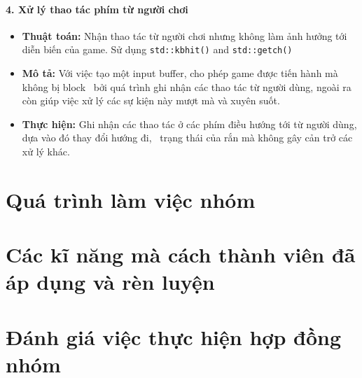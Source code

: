 \documentclass[12pt]{report}
\begin{document}
\subsubsection*{4. Xử lý thao tác phím từ người chơi}
\begin{itemize}
    \item \textbf{Thuật toán:} Nhận thao tác từ người chơi nhưng không làm ảnh hưởng tới diễn biến của game. Sử dụng \texttt{std::kbhit()} and \texttt{std::getch()}
    \item \textbf{Mô tả:} Với việc tạo một input buffer, cho phép game được tiến hành mà không bị block \
          bởi quá trình ghi nhận các thao tác từ người dùng, ngoài ra còn giúp việc xử lý các sự kiện này mượt mà và xuyên suốt.
    \item \textbf{Thực hiện:} Ghi nhận các thao tác ở các phím điều hướng tới từ người dùng, dựa vào đó thay đổi hướng đi, \
          trạng thái của rắn mà không gây cản trở các xử lý khác.
\end{itemize}


\chapter{Quá trình làm việc nhóm}
\label{sec:work_process}

\chapter{Các kĩ năng mà cách thành viên đã áp dụng và rèn luyện}
\label{sec:used_skills}

\chapter{Đánh giá việc thực hiện hợp đồng nhóm}
\label{sec:member_ratings}
\end{document}
